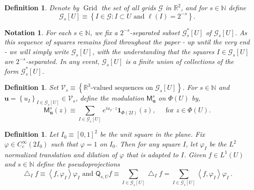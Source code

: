 \documentclass{amsart}%
\theoremstyle{plain}
\newtheorem{definition}[theorem]{Definition}
\newtheorem{notation}[theorem]{Notation}
\numberwithin{equation}{section}
\begin{document}
\begin{definition}
Denote by $\operatorname*{Grid}$ the set of all grids $\mathcal{G}$ in
$\mathbb{R}^{2}$, and for $s\in\mathbb{N}$ define%
\[
\mathcal{G}_{s}\left[  U\right]  \equiv\left\{  I\in\mathcal{G}:I\subset
U\text{ and }\ell\left(  I\right)  =2^{-s}\right\}  .
\]

\end{definition}

\begin{notation}
For each $s\in\mathbb{N}$, we fix a $2^{-s}$-separated subset $\mathcal{G}%
_{s}^{\ast}\left[  U\right]  $ of $\mathcal{G}_{s}\left[  U\right]  $. As this
sequence of squares remains fixed throughout the paper - up until the very end
- we will simply write $\mathcal{G}_{s}\left[  U\right]  $, with the
understanding that the squares $I\in\mathcal{G}_{s}\left[  U\right]  $ are
$2^{-s}$-separated. In any event, $\mathcal{G}_{s}\left[  U\right]  $ is a
finite union of collections of the form $\mathcal{G}_{s}^{\ast}\left[
U\right]  $.
\end{notation}

\begin{definition}
\label{def M}Set $\mathcal{V}_{s}\equiv\left\{  \mathbb{R}^{3}\text{-valued
sequences on }\mathcal{G}_{s}\left[  U\right]  \right\}  $. For $s\in
\mathbb{N} $ and $\mathbf{u}=\left\{  u_{I}\right\}  _{I\in\mathcal{G}%
_{s}\left[  U\right]  }\in\mathcal{V}_{s}$, define the modulation
$\mathsf{M}_{\mathbf{u}}^{s}$ on $\Phi\left(  U\right)  $ by,%
\[
\mathsf{M}_{\mathbf{u}}^{s}\left(  z\right)  \equiv\sum_{I\in\mathcal{G}%
_{s}\left[  U\right]  }e^{iu_{I}\cdot z}\mathbf{1}_{\Phi\left(  2I\right)
}\left(  z\right)  ,\ \ \ \ \ \text{\ for }z\in\Phi\left(  U\right)  .
\]

\end{definition}

\begin{definition}
\label{def Q}Let $I_{0}\equiv\left[  0,1\right]  ^{2}$ be the unit square in
the plane. Fix $\varphi\in C_{c}^{\infty}\left(  2I_{0}\right)  $ such that
$\varphi=1$ on $I_{0}$. Then for any square $I$, let $\varphi_{I}$ be the
$L^{2}$ normalized translation and dilation of $\varphi$ that is adapted to
$I$. Given $f\in L^{1}\left(  U\right)  $ and $s\in\mathbb{N}$ define the
pseudoprojections
\[
\bigtriangleup_{I}f\equiv\left\langle f,\varphi_{I}\right\rangle \varphi
_{I}\text{ and }\mathsf{Q}_{s,U}f\equiv\sum_{I\in\mathcal{G}_{s}\left[
U\right]  }\bigtriangleup_{I}f=\sum_{I\in\mathcal{G}_{s}\left[  U\right]
}\left\langle f,\varphi_{I}\right\rangle \varphi_{I}\ .
\]

\end{definition}
\end{document}
